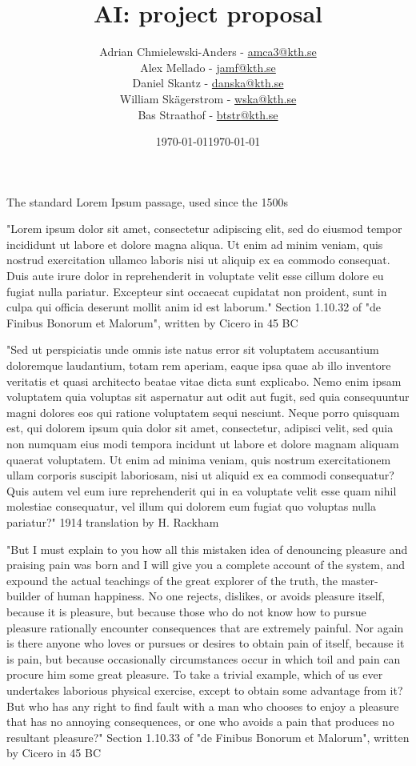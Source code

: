 \documentclass{article}
\title{AI: project proposal}
\author{
Adrian Chmielewski-Anders - \href{mailto:amca3@kth.se}{amca3@kth.se} \\
Alex Mellado - \href{mailto:jamf@kth.se}{jamf@kth.se} \\
Daniel Skantz - \href{mailto:danska@kth.se}{danska@kth.se} \\
William Skägerstrom - \href{mailto:wska@kth.se}{wska@kth.se} \\
Bas Straathof - \href{mailto:btstr@kth.se}{btstr@kth.se}}
\date{\today}
\date{\today}
\begin{document}
\maketitle


The standard Lorem Ipsum passage, used since the 1500s

"Lorem ipsum dolor sit amet, consectetur adipiscing elit, sed do eiusmod tempor incididunt ut labore et dolore magna aliqua. Ut enim ad minim veniam, quis nostrud exercitation ullamco laboris nisi ut aliquip ex ea commodo consequat. Duis aute irure dolor in reprehenderit in voluptate velit esse cillum dolore eu fugiat nulla pariatur. Excepteur sint occaecat cupidatat non proident, sunt in culpa qui officia deserunt mollit anim id est laborum."
Section 1.10.32 of "de Finibus Bonorum et Malorum", written by Cicero in 45 BC

"Sed ut perspiciatis unde omnis iste natus error sit voluptatem accusantium doloremque laudantium, totam rem aperiam, eaque ipsa quae ab illo inventore veritatis et quasi architecto beatae vitae dicta sunt explicabo. Nemo enim ipsam voluptatem quia voluptas sit aspernatur aut odit aut fugit, sed quia consequuntur magni dolores eos qui ratione voluptatem sequi nesciunt. Neque porro quisquam est, qui dolorem ipsum quia dolor sit amet, consectetur, adipisci velit, sed quia non numquam eius modi tempora incidunt ut labore et dolore magnam aliquam quaerat voluptatem. Ut enim ad minima veniam, quis nostrum exercitationem ullam corporis suscipit laboriosam, nisi ut aliquid ex ea commodi consequatur? Quis autem vel eum iure reprehenderit qui in ea voluptate velit esse quam nihil molestiae consequatur, vel illum qui dolorem eum fugiat quo voluptas nulla pariatur?"
1914 translation by H. Rackham

"But I must explain to you how all this mistaken idea of denouncing pleasure and praising pain was born and I will give you a complete account of the system, and expound the actual teachings of the great explorer of the truth, the master-builder of human happiness. No one rejects, dislikes, or avoids pleasure itself, because it is pleasure, but because those who do not know how to pursue pleasure rationally encounter consequences that are extremely painful. Nor again is there anyone who loves or pursues or desires to obtain pain of itself, because it is pain, but because occasionally circumstances occur in which toil and pain can procure him some great pleasure. To take a trivial example, which of us ever undertakes laborious physical exercise, except to obtain some advantage from it? But who has any right to find fault with a man who chooses to enjoy a pleasure that has no annoying consequences, or one who avoids a pain that produces no resultant pleasure?"
Section 1.10.33 of "de Finibus Bonorum et Malorum", written by Cicero in 45 BC
\end{document}

